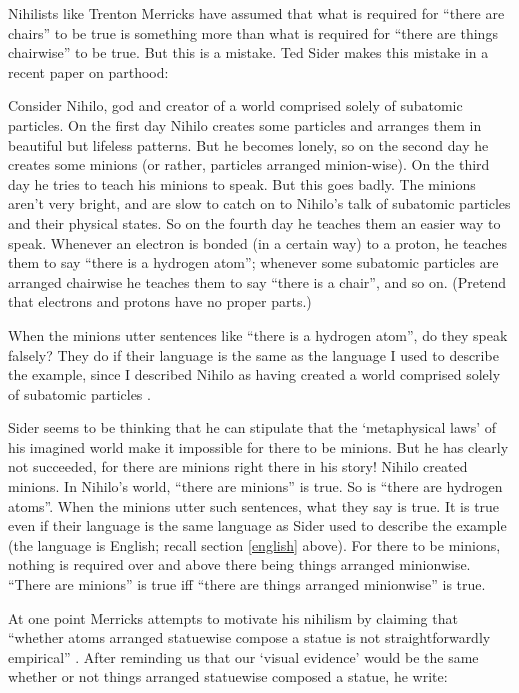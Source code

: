 \documentclass[11pt]{article}
\newenvironment{squote}{%
\begin{spacing}{1}
       	\begin{list}{}{%
\setlength{\labelwidth}{0pt}%
\rightmargin\leftmargin%
}
\item\relax
}{%
\end{list}%
\end{spacing}
}
\begin{document}
\begin{spacing}{1.25}
Nihilists like Trenton Merricks have assumed that what is required for
``there are chairs'' to be true is something more than what is
required for ``there are things chairwise'' to be true.  But this is a
mistake.  Ted Sider makes this mistake in a recent paper on parthood:

\begin{squote}
Consider Nihilo, god and creator of a world comprised solely of
subatomic particles.  On the first day Nihilo creates some particles
and arranges them in beautiful but lifeless patterns.  But he becomes
lonely, so on the second day he creates some minions (or rather,
particles arranged minion-wise).  On the third day he tries to teach
his minions to speak.  But this goes badly.  The minions aren't very
bright, and are slow to catch on to Nihilo's talk of subatomic
particles and their physical states.  So on the fourth day he teaches
them an easier way to speak.  Whenever an electron is bonded (in a
certain way) to a proton, he teaches them to say ``there is a hydrogen
atom''; whenever some subatomic particles are arranged chairwise he
teaches them to say ``there is a chair'', and so on.  (Pretend that
electrons and protons have no proper parts.)

When the minions utter sentences like ``there is a hydrogen atom'', do
they speak falsely?  They do if their language is the same as the
language I used to describe the example, since I described Nihilo as
having created a world comprised solely of subatomic particles
\citeyearpar[7]{sider2011c}.
\end{squote}

Sider seems to be thinking that he can stipulate that the
`metaphysical laws' of his imagined world make it impossible for there
to be minions.  But he has clearly not succeeded, for there are
minions right there in his story!  Nihilo created minions.  In
Nihilo's world, ``there are minions'' is true.  So is ``there are
hydrogen atoms''.  When the minions utter such sentences, what they
say is true.  It is true even if their language is the same language
as Sider used to describe the example (the language is English; recall
section \ref{english} above).  For there to be minions, nothing is
required over and above there being things arranged minionwise.
``There are minions'' is true iff ``there are things arranged
minionwise'' is true.

At one point Merricks attempts to motivate his nihilism by claiming
that ``whether atoms arranged statuewise compose a statue is not
straightforwardly empirical'' \citeyearpar[9]{merricks2001a}.  After
reminding us that our `visual evidence' would be the same whether or
not things arranged statuewise composed a statue, he write:


\end{spacing}
\end{document}
